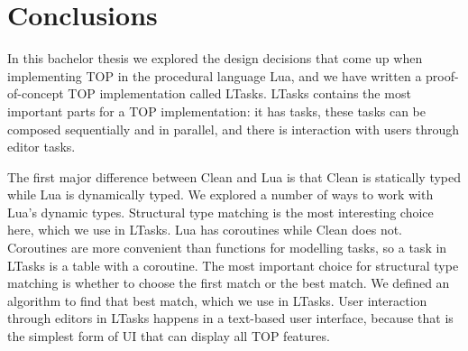 \chapter{Conclusions}\label{conclusions}

In this bachelor thesis we explored the design decisions that come up when implementing TOP in the procedural language Lua, and we have written a proof-of-concept TOP implementation called LTasks.
LTasks contains the most important parts for a TOP implementation: it has tasks, these tasks can be composed sequentially and in parallel, and there is interaction with users through editor tasks.

The first major difference between Clean and Lua is that Clean is statically typed while Lua is dynamically typed.
We explored a number of ways to work with Lua's dynamic types. Structural type matching is the most interesting choice here, which we use in LTasks.
Lua has coroutines while Clean does not. Coroutines are more convenient than functions for modelling tasks, so a task in LTasks is a table with a coroutine.
The most important choice for structural type matching is whether to choose the first match or the best match. We defined an algorithm to find that best match, which we use in LTasks.
User interaction through editors in LTasks happens in a text-based user interface, because that is the simplest form of UI that can display all TOP features.





